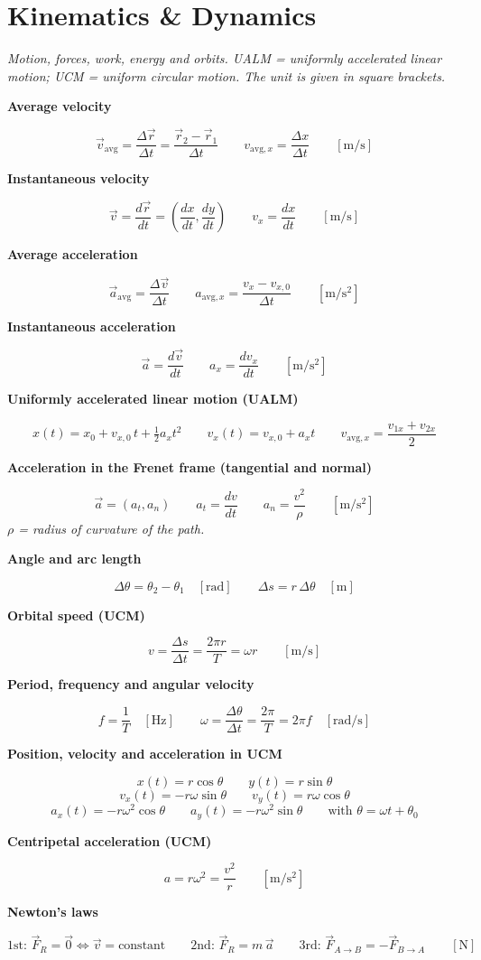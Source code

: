 \documentclass[11pt]{article}
\newcommand{\sect}[2]{\section*{\color{#1}#2}}
\newcommand{\sub}[1]{\par\medskip\textbf{#1}\par}
\newcommand{\expl}[1]{{\color{gray}\itshape #1}\par}
\begin{document}
\sect{cKin}{Kinematics \& Dynamics}
\expl{Motion, forces, work, energy and orbits. UALM = uniformly accelerated linear motion; UCM = uniform circular motion. The unit is given in square brackets.}

\sub{Average velocity}
\[ \vec v_{\text{avg}} = \frac{\Delta\vec r}{\Delta t} = \frac{\vec r_2 - \vec r_1}{\Delta t} \qquad v_{\text{avg},x} = \frac{\Delta x}{\Delta t} \qquad [\mathrm{m/s}] \]

\sub{Instantaneous velocity}
\[ \vec v = \frac{d\vec r}{dt} = \left(\frac{dx}{dt}, \frac{dy}{dt}\right) \qquad v_x = \frac{dx}{dt} \qquad [\mathrm{m/s}] \]

\sub{Average acceleration}
\[ \vec a_{\text{avg}} = \frac{\Delta\vec v}{\Delta t} \qquad a_{\text{avg},x} = \frac{v_x - v_{x,0}}{\Delta t} \qquad [\mathrm{m/s^2}] \]

\sub{Instantaneous acceleration}
\[ \vec a = \frac{d\vec v}{dt} \qquad a_x = \frac{dv_x}{dt} \qquad [\mathrm{m/s^2}] \]

\sub{Uniformly accelerated linear motion (UALM)}
\[ x(t) = x_0 + v_{x,0}\,t + \tfrac{1}{2}a_x t^2 \qquad v_x(t) = v_{x,0} + a_x t \qquad v_{\text{avg},x} = \frac{v_{1x} + v_{2x}}{2} \]

\sub{Acceleration in the Frenet frame (tangential and normal)}
\[ \vec a = (a_t, a_n) \qquad a_t = \frac{dv}{dt} \qquad a_n = \frac{v^2}{\rho} \qquad [\mathrm{m/s^2}] \]
\expl{$\rho$ = radius of curvature of the path.}

\sub{Angle and arc length}
\[ \Delta\theta = \theta_2 - \theta_1 \quad [\mathrm{rad}] \qquad \Delta s = r\,\Delta\theta \quad [\mathrm{m}] \]

\sub{Orbital speed (UCM)}
\[ v = \frac{\Delta s}{\Delta t} = \frac{2\pi r}{T} = \omega r \qquad [\mathrm{m/s}] \]

\sub{Period, frequency and angular velocity}
\[ f = \frac{1}{T} \quad [\mathrm{Hz}] \qquad \omega = \frac{\Delta\theta}{\Delta t} = \frac{2\pi}{T} = 2\pi f \quad [\mathrm{rad/s}] \]

\sub{Position, velocity and acceleration in UCM}
\[ x(t) = r\cos\theta \qquad y(t) = r\sin\theta \]
\[ v_x(t) = -r\omega\sin\theta \qquad v_y(t) = r\omega\cos\theta \]
\[ a_x(t) = -r\omega^2\cos\theta \qquad a_y(t) = -r\omega^2\sin\theta \qquad \text{with } \theta = \omega t + \theta_0 \]

\sub{Centripetal acceleration (UCM)}
\[ a = r\omega^2 = \frac{v^2}{r} \qquad [\mathrm{m/s^2}] \]

\sub{Newton's laws}
\[ \text{1st: } \vec F_R = \vec 0 \Leftrightarrow \vec v = \text{constant} \qquad \text{2nd: } \vec F_R = m\,\vec a \qquad \text{3rd: } \vec F_{A\to B} = -\vec F_{B\to A} \qquad [\mathrm{N}] \]
\end{document}
